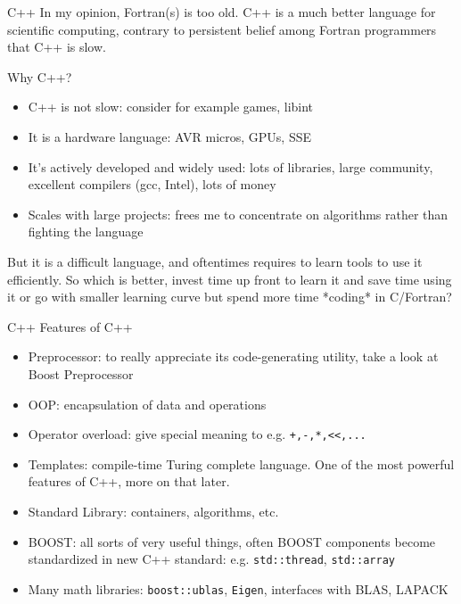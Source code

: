 \documentclass{beamer}
\begin{document}
\begin{frame}{C++}
In my opinion, Fortran(s) is too old.  C++ is a much better language  for scientific computing, contrary to persistent belief among Fortran programmers that C++ is slow.

Why C++?
  \begin{itemize}
  \item C++ is not slow: consider for example games, libint
  \item It is a hardware language: AVR micros, GPUs, SSE
  \item It's actively developed and widely used: lots of
    libraries,  large community, excellent compilers (gcc, Intel), lots of money
  \item Scales with large projects: frees me to concentrate on
    algorithms rather than fighting the language
\end{itemize}
 
But it is a difficult language, and oftentimes requires to learn
tools to use it efficiently.  So which is better, invest time up
front to learn it  and save time using it or go with smaller
learning curve but spend more time *coding* in C/Fortran?

\end{frame}

\begin{frame}{C++}
  Features of C++
  \begin{itemize}
  \item Preprocessor: to really appreciate its code-generating utility,
    take a look at Boost Preprocessor
  \item OOP: encapsulation of data and operations
  \item Operator overload: give special meaning to e.g.
    {\tt +,-,*,<<,...}
  \item Templates: compile-time Turing complete language.
    One of the most powerful features of C++, more on that later.
  \item Standard Library: containers, algorithms, etc.
  \item BOOST: all sorts of very useful things, often BOOST components
    become standardized in new C++ standard:
    e.g. {\tt std::thread}, {\tt std::array}
  \item Many math libraries: {\tt boost::ublas}, {\tt Eigen}, interfaces
    with BLAS, LAPACK
  \end{itemize}
\end{frame}
\end{document}
